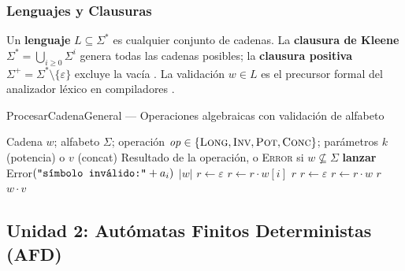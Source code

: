 \subsubsection*{Lenguajes y Clausuras}

Un \textbf{lenguaje} $L \subseteq \Sigma^*$ es cualquier conjunto de cadenas. La
\textbf{clausura de Kleene} $\Sigma^* = \bigcup_{i \geq 0}\Sigma^i$ genera todas las cadenas
posibles; la \textbf{clausura positiva} $\Sigma^+ = \Sigma^* \setminus \{\varepsilon\}$ excluye
la vacía \cite{eugene2008}. La validación $w \in L$ es el precursor formal del analizador léxico
en compiladores \cite{decastro2004}.

\begin{algobox}{ProcesarCadenaGeneral — Operaciones algebraicas con validación de alfabeto}
\begin{algorithmic}[1]
  \Require Cadena $w$; alfabeto $\Sigma$;
           operación $\mathit{op} \in \{\textsc{Long}, \textsc{Inv}, \textsc{Pot}, \textsc{Conc}\}$;
           parámetros $k$ (potencia) o $v$ (concat)
  \Ensure  Resultado de la operación, o \textsc{Error} si $w \not\subseteq \Sigma$
  \State
        \State \textbf{lanzar} Error$({\texttt{\textquotedbl{}símbolo inválido:\textquotedbl{}}} + a_i)$
      \EndIf
    \EndFor
  \EndFunction
  \State
  \State {}
  \State
    \State \Return $|w|$ 
    \State $r \gets \varepsilon$
      \State $r \gets r \cdot w[i]$
    \EndFor
    \State \Return $r$ 
    \State $r \gets \varepsilon$
      \State $r \gets r \cdot w$
    \EndFor
    \State \Return $r$ 
    \State \Return $w \cdot v$ 
  \EndIf
\end{algorithmic}
\end{algobox}

\newpage
\subsection*{Unidad 2: Autómatas Finitos Deterministas (AFD)}

